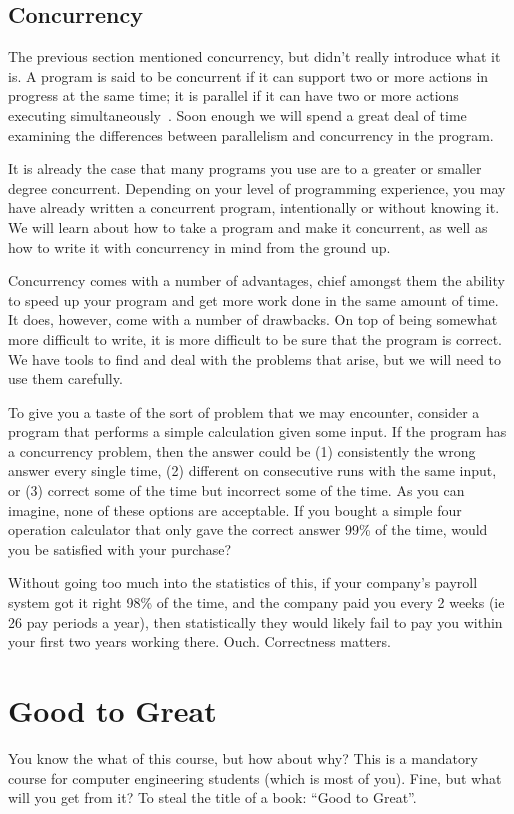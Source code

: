 \subsection*{Concurrency}

The previous section mentioned concurrency, but didn't really introduce what it is. A program is said to be concurrent if it can support two or more actions in progress at the same time; it is parallel if it can have two or more actions executing simultaneously~\cite{artofc}. Soon enough we will spend a great deal of time examining the differences between parallelism and concurrency in the program.

It is already the case that many programs you use are to a greater or smaller degree concurrent. Depending on your level of programming experience, you may have already written a concurrent program, intentionally or without knowing it. We will learn about how to take a program and make it concurrent, as well as how to write it with concurrency in mind from the ground up.

Concurrency comes with a number of advantages, chief amongst them the ability to speed up your program and get more work done in the same amount of time. It does, however, come with a number of drawbacks. On top of being somewhat more difficult to write, it is more difficult to be sure that the program is correct. We have tools to find and deal with the problems that arise, but we will need to use them carefully.

To give you a taste of the sort of problem that we may encounter, consider a program that performs a simple calculation given some input. If the program has a concurrency problem,  then the answer could be (1) consistently the wrong answer every single time, (2) different on consecutive runs with the same input, or (3) correct some of the time but incorrect some of the time. As you can imagine, none of these options are acceptable. If you bought a simple four operation calculator that only gave the correct answer 99\% of the time, would you be satisfied with your purchase?

Without going too much into the statistics of this, if your company's payroll system got it right 98\% of the time, and the company paid you every 2 weeks (ie 26 pay periods a year), then statistically they would likely fail to pay you  within your first two years working there. Ouch. Correctness matters.

\section*{Good to Great}
You know the what of this course, but how about why? This is a mandatory course for computer engineering students (which is most of you). Fine, but what will you get from it? To steal the title of a book: ``Good to Great''.

